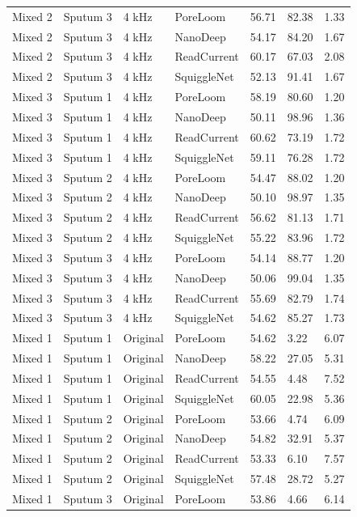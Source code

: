 \begin{longtable}{lllllll}
Mixed 2 & Sputum 3 & 4 kHz & PoreLoom & 56.71 & 82.38 & 1.33\\
Mixed 2 & Sputum 3 & 4 kHz & NanoDeep & 54.17 & 84.20 & 1.67\\
Mixed 2 & Sputum 3 & 4 kHz & ReadCurrent & 60.17 & 67.03 & 2.08\\
Mixed 2 & Sputum 3 & 4 kHz & SquiggleNet & 52.13 & 91.41 & 1.67\\
Mixed 3 & Sputum 1 & 4 kHz & PoreLoom & 58.19 & 80.60 & 1.20\\
Mixed 3 & Sputum 1 & 4 kHz & NanoDeep & 50.11 & 98.96 & 1.36\\
Mixed 3 & Sputum 1 & 4 kHz & ReadCurrent & 60.62 & 73.19 & 1.72\\
Mixed 3 & Sputum 1 & 4 kHz & SquiggleNet & 59.11 & 76.28 & 1.72\\
Mixed 3 & Sputum 2 & 4 kHz & PoreLoom & 54.47 & 88.02 & 1.20\\
Mixed 3 & Sputum 2 & 4 kHz & NanoDeep & 50.10 & 98.97 & 1.35\\
Mixed 3 & Sputum 2 & 4 kHz & ReadCurrent & 56.62 & 81.13 & 1.71\\
Mixed 3 & Sputum 2 & 4 kHz & SquiggleNet & 55.22 & 83.96 & 1.72\\
Mixed 3 & Sputum 3 & 4 kHz & PoreLoom & 54.14 & 88.77 & 1.20\\
Mixed 3 & Sputum 3 & 4 kHz & NanoDeep & 50.06 & 99.04 & 1.35\\
Mixed 3 & Sputum 3 & 4 kHz & ReadCurrent & 55.69 & 82.79 & 1.74\\
Mixed 3 & Sputum 3 & 4 kHz & SquiggleNet & 54.62 & 85.27 & 1.73\\
Mixed 1 & Sputum 1 & Original & PoreLoom & 54.62 & 3.22 & 6.07\\
Mixed 1 & Sputum 1 & Original & NanoDeep & 58.22 & 27.05 & 5.31\\
Mixed 1 & Sputum 1 & Original & ReadCurrent & 54.55 & 4.48 & 7.52\\
Mixed 1 & Sputum 1 & Original & SquiggleNet & 60.05 & 22.98 & 5.36\\
Mixed 1 & Sputum 2 & Original & PoreLoom & 53.66 & 4.74 & 6.09\\
Mixed 1 & Sputum 2 & Original & NanoDeep & 54.82 & 32.91 & 5.37\\
Mixed 1 & Sputum 2 & Original & ReadCurrent & 53.33 & 6.10 & 7.57\\
Mixed 1 & Sputum 2 & Original & SquiggleNet & 57.48 & 28.72 & 5.27\\
Mixed 1 & Sputum 3 & Original & PoreLoom & 53.86 & 4.66 & 6.14\\

\end{longtable}
